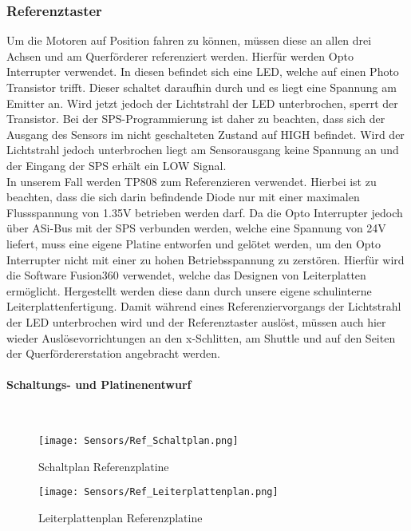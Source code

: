 \subsubsection{Referenztaster}
Um die Motoren auf Position fahren zu können, müssen diese an allen drei Achsen und am Querförderer referenziert werden. Hierfür werden Opto Interrupter verwendet. In diesen befindet sich eine LED, welche auf einen Photo Transistor trifft. Dieser schaltet daraufhin durch und es liegt eine Spannung am Emitter an. Wird jetzt jedoch der Lichtstrahl der LED unterbrochen, sperrt der Transistor. Bei der SPS-Programmierung ist daher zu beachten, dass sich der Ausgang des Sensors im nicht geschalteten Zustand auf HIGH befindet. Wird der Lichtstrahl jedoch unterbrochen liegt am Sensorausgang keine Spannung an und der Eingang der SPS erhält ein LOW Signal.\\
In unserem Fall werden TP808 zum Referenzieren verwendet. Hierbei ist zu beachten, dass die sich darin befindende Diode nur mit einer maximalen Flussspannung von 1.35V betrieben werden darf.\cite{TP808} Da die Opto Interrupter jedoch über ASi-Bus mit der SPS verbunden werden, welche eine Spannung von 24V liefert, muss eine eigene Platine entworfen und gelötet werden, um den Opto Interrupter nicht mit einer zu hohen Betriebsspannung zu zerstören. Hierfür wird die Software Fusion360 verwendet, welche das Designen von Leiterplatten ermöglicht. Hergestellt werden diese dann durch unsere eigene schulinterne Leiterplattenfertigung. Damit während eines Referenziervorgangs der Lichtstrahl der LED unterbrochen wird und der Referenztaster auslöst, müssen auch hier wieder Auslösevorrichtungen an den x-Schlitten, am Shuttle und auf den Seiten der Querfördererstation angebracht werden.

\paragraph{Schaltungs- und Platinenentwurf} \mbox{}\\


\begin{figure}[H]
    \centering
    \texttt{[image: Sensors/Ref\_Schaltplan.png]}
    \caption{Schaltplan Referenzplatine}
    \label{Ref_Schaltplan}
\end{figure}

\begin{figure}[H]
    \centering
    \texttt{[image: Sensors/Ref\_Leiterplattenplan.png]}
    \caption{Leiterplattenplan Referenzplatine}
    \label{Ref_LPPlan}
\end{figure}


